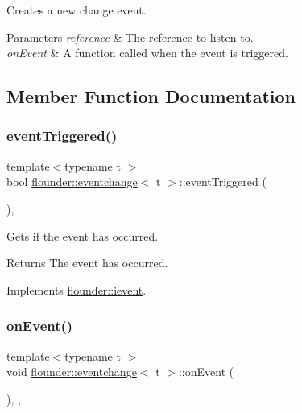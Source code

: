Creates a new change event. 


\begin{DoxyParams}{Parameters}
{\em reference} & The reference to listen to. \\
\hline
{\em on\+Event} & A function called when the event is triggered. \\
\hline
\end{DoxyParams}


\subsection{Member Function Documentation}
\mbox{\label{classflounder_1_1eventchange_a2ae3c1f7ae4342dfff2aae6f11b0b413}} 
\subsubsection{\texorpdfstring{event\+Triggered()}{eventTriggered()}}
{\footnotesize\ttfamily template$<$typename t $>$ \\
bool \hyperlink{classflounder_1_1eventchange}{flounder\+::eventchange}$<$ t $>$\+::event\+Triggered (\begin{DoxyParamCaption}{ }\end{DoxyParamCaption})\hspace{0.3cm}{\ttfamily [override]}, {\ttfamily [virtual]}}



Gets if the event has occurred. 

\begin{DoxyReturn}{Returns}
The event has occurred. 
\end{DoxyReturn}


Implements \hyperlink{classflounder_1_1ievent_a4462f66feef99ef4e3521c00f4edd0c9}{flounder\+::ievent}.

\mbox{\label{classflounder_1_1eventchange_aa4fd4c3c28ac6927c3a810c8775f232d}} 
\subsubsection{\texorpdfstring{on\+Event()}{onEvent()}}
{\footnotesize\ttfamily template$<$typename t $>$ \\
void \hyperlink{classflounder_1_1eventchange}{flounder\+::eventchange}$<$ t $>$\+::on\+Event (\begin{DoxyParamCaption}{ }\end{DoxyParamCaption})\hspace{0.3cm}{\ttfamily [inline]}, {\ttfamily [override]}, {\ttfamily [virtual]}}



